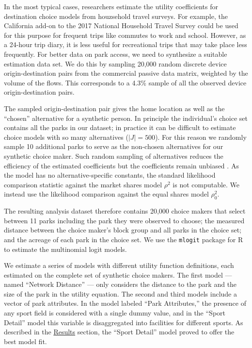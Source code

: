 \documentclass[3p, authoryear, review]{elsarticle} %
\begin{document}
In the most typical cases, researchers estimate the utility coefficients for destination choice models from houzsehold travel surveys. For example, the California add-on to the 2017 National Household Travel Survey could be used for this purpose for frequent trips like commutes to work and school. However, as a 24-hour trip diary, it is less useful for recreational trips that may take place less frequently. For better data on park access, we need to synthesize a suitable estimation data set. We do this by sampling 20,000 random discrete device origin-destination pairs from the commercial passive data matrix, weighted by the volume of the flows. This corresponds to a 4.3\% sample of all the observed device origin-destination pairs.

The sampled origin-destination pair gives the home location as well as the ``chosen'' alternative for a synthetic person. In principle the individual's choice set contains all the parks in our dataset; in practice it can be difficult to estimate choice models with so many alternatives (\(|J| = 500\)). For this reason we randomly sample 10 additional parks to serve as the non-chosen alternatives for our synthetic choice maker. Such random sampling of alternatives reduces the efficiency of the estimated coefficients but the coefficients remain unbiased \citep{train2009}. As the model has no alternative-specific constants, the standard likelihood comparison statistic against the market shares model \(\rho^2\) is not computable. We instead use the likelihood comparison against the equal shares model \(\rho_0^2\).

The resulting analysis dataset therefore contains 20,000 choice makers that select between 11 parks including the park they were observed to choose; the measured distance between the choice maker's block group and all parks in the choice set; and the acreage of each park in the choice set. We use the \texttt{mlogit} package for R \citep{mlogit, R} to estimate the multinomial logit models.

We estimate a series of models with different utility function definitions, each estimated on the complete set of synthetic choice makers. The first model --- named ``Network Distance'' --- only considers the distance to the park and the size of the park in the utility equation. The second and third models include a vector of park attributes. In the model labeled ``Park Attributes,'' the presence of any sport field is considered with a single dummy value, and in the ``Sport Detail'' model this variable is disaggregated into facilities for different sports. As described in the \protect\hyperlink{results}{Results} section, the ``Sport Detail'' model proved to offer the best model fit.
\end{document}
